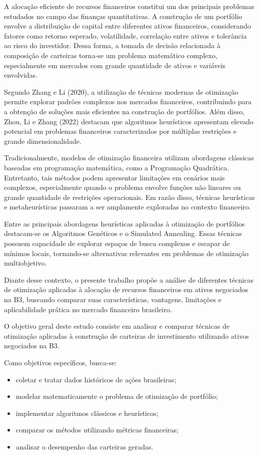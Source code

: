 \documentclass[
  12pt,
  oneside,
  a4paper,
  brazil
]{abntex2}
\begin{document}
A alocação eficiente de recursos financeiros constitui um dos principais problemas estudados no campo das finanças quantitativas. A construção de um portfólio envolve a distribuição de capital entre diferentes ativos financeiros, considerando fatores como retorno esperado, volatilidade, correlação entre ativos e tolerância ao risco do investidor. Dessa forma, a tomada de decisão relacionada à composição de carteiras torna-se um problema matemático complexo, especialmente em mercados com grande quantidade de ativos e variáveis envolvidas.

Segundo Zhang e Li (2020), a utilização de técnicas modernas de otimização permite explorar padrões complexos nos mercados financeiros, contribuindo para a obtenção de soluções mais eficientes na construção de portfólios. Além disso, Zhou, Li e Zhang (2022) destacam que algoritmos heurísticos apresentam elevado potencial em problemas financeiros caracterizados por múltiplas restrições e grande dimensionalidade.

Tradicionalmente, modelos de otimização financeira utilizam abordagens clássicas baseadas em programação matemática, como a Programação Quadrática. Entretanto, tais métodos podem apresentar limitações em cenários mais complexos, especialmente quando o problema envolve funções não lineares ou grande quantidade de restrições operacionais. Em razão disso, técnicas heurísticas e metaheurísticas passaram a ser amplamente exploradas no contexto financeiro.

Entre as principais abordagens heurísticas aplicadas à otimização de portfólios destacam-se os Algoritmos Genéticos e o Simulated Annealing. Essas técnicas possuem capacidade de explorar espaços de busca complexos e escapar de mínimos locais, tornando-se alternativas relevantes em problemas de otimização multiobjetivo.

Diante desse contexto, o presente trabalho propõe a análise de diferentes técnicas de otimização aplicadas à alocação de recursos financeiros em ativos negociados na B3, buscando comparar suas características, vantagens, limitações e aplicabilidade prática no mercado financeiro brasileiro.

O objetivo geral deste estudo consiste em analisar e comparar técnicas de otimização aplicadas à construção de carteiras de investimento utilizando ativos negociados na B3.

Como objetivos específicos, busca-se:
\begin{itemize}
  \item coletar e tratar dados históricos de ações brasileiras;
  \item modelar matematicamente o problema de otimização de portfólio;
  \item implementar algoritmos clássicos e heurísticos;
  \item comparar os métodos utilizando métricas financeiras;
  \item analisar o desempenho das carteiras geradas.
\end{itemize}
\end{document}
